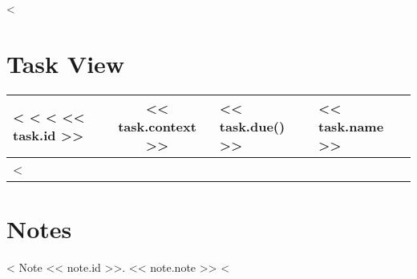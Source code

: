 \documentclass[a4paper, landscape]{article}
\begin{document}
\begin{itemize}
<%
\item{<%
<%
\end{itemize}


<%

\newpage
\section{Task View}

\begin{tabular*}{\textwidth}{|l|c|l|l|}
\hline
<%
<%
\rowcolor[gray]{0.5}
<%
<< task.id >> & << task.context >> & << task.due() >> & << task.name >> \\
        \hline
<%
\end{tabular*}

\newpage
\section{Notes}

<%
Note << note.id >>. << note.note >>
<%
\end{document}
